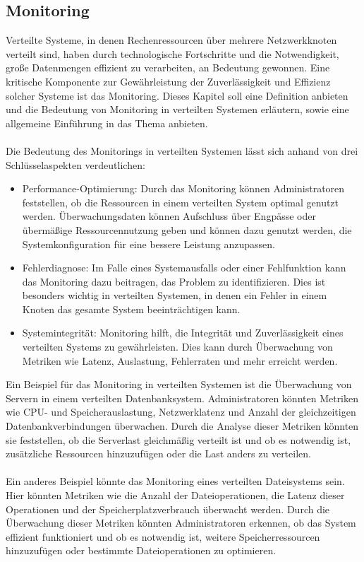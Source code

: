 \documentclass[../vs-script-first-v01.tex]{subfiles}
\begin{document}
\subsection{Monitoring}
Verteilte Systeme, in denen Rechenressourcen über mehrere Netzwerkknoten verteilt sind, haben durch technologische Fortschritte und die Notwendigkeit, große Datenmengen effizient zu verarbeiten, an Bedeutung gewonnen. Eine kritische Komponente zur Gewährleistung der Zuverlässigkeit und Effizienz solcher Systeme ist das Monitoring. Dieses Kapitel soll eine Definition anbieten und die Bedeutung von Monitoring in verteilten Systemen erläutern, sowie eine allgemeine Einführung in das Thema anbieten. 
\\\\
Die Bedeutung des Monitorings in verteilten Systemen lässt sich anhand von drei Schlüsselaspekten verdeutlichen: 
\begin{itemize}
\item Performance-Optimierung: Durch das Monitoring können Administratoren feststellen, ob die Ressourcen in einem verteilten System optimal genutzt werden. Überwachungsdaten können Aufschluss über Engpässe oder übermäßige Ressourcennutzung geben und können dazu genutzt werden, die Systemkonfiguration für eine bessere Leistung anzupassen.
\item Fehlerdiagnose: Im Falle eines Systemausfalls oder einer Fehlfunktion kann das Monitoring dazu beitragen, das Problem zu identifizieren. Dies ist besonders wichtig in verteilten Systemen, in denen ein Fehler in einem Knoten das gesamte System beeinträchtigen kann.
\item Systemintegrität: Monitoring hilft, die Integrität und Zuverlässigkeit eines verteilten Systems zu gewährleisten. Dies kann durch Überwachung von Metriken wie Latenz, Auslastung, Fehlerraten und mehr erreicht werden.
\end{itemize}
Ein Beispiel für das Monitoring in verteilten Systemen ist die Überwachung von Servern in einem verteilten Datenbanksystem. Administratoren könnten Metriken wie CPU- und Speicherauslastung, Netzwerklatenz und Anzahl der gleichzeitigen Datenbankverbindungen überwachen. Durch die Analyse dieser Metriken könnten sie feststellen, ob die Serverlast gleichmäßig verteilt ist und ob es notwendig ist, zusätzliche Ressourcen hinzuzufügen oder die Last anders zu verteilen.
\\\\
Ein anderes Beispiel könnte das Monitoring eines verteilten Dateisystems sein. Hier könnten Metriken wie die Anzahl der Dateioperationen, die Latenz dieser Operationen und der Speicherplatzverbrauch überwacht werden. Durch die Überwachung dieser Metriken könnten Administratoren erkennen, ob das System effizient funktioniert und ob es notwendig ist, weitere Speicherressourcen hinzuzufügen oder bestimmte Dateioperationen zu optimieren.
\end{document}
